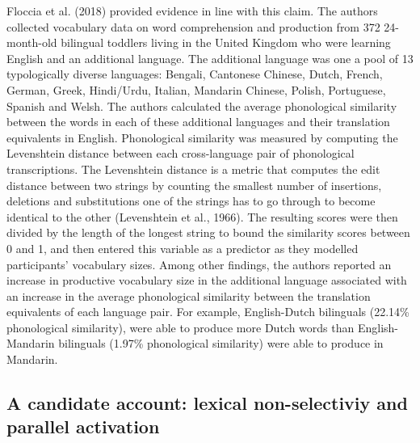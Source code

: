 \documentclass[
  letterpaper,
  DIV=11,
  numbers=noendperiod]{scrartcl}
\begin{document}
Floccia et al. (2018) provided evidence in line with this claim. The
authors collected vocabulary data on word comprehension and production
from 372 24-month-old bilingual toddlers living in the United Kingdom
who were learning English and an additional language. The additional
language was one a pool of 13 typologically diverse languages: Bengali,
Cantonese Chinese, Dutch, French, German, Greek, Hindi/Urdu, Italian,
Mandarin Chinese, Polish, Portuguese, Spanish and Welsh. The authors
calculated the average phonological similarity between the words in each
of these additional languages and their translation equivalents in
English. Phonological similarity was measured by computing the
Levenshtein distance between each cross-language pair of phonological
transcriptions. The Levenshtein distance is a metric that computes the
edit distance between two strings by counting the smallest number of
insertions, deletions and substitutions one of the strings has to go
through to become identical to the other (Levenshtein et al., 1966). The
resulting scores were then divided by the length of the longest string
to bound the similarity scores between 0 and 1, and then entered this
variable as a predictor as they modelled participants' vocabulary sizes.
Among other findings, the authors reported an increase in productive
vocabulary size in the additional language associated with an increase
in the average phonological similarity between the translation
equivalents of each language pair. For example, English-Dutch bilinguals
(22.14\% phonological similarity), were able to produce more Dutch words
than English-Mandarin bilinguals (1.97\% phonological similarity) were
able to produce in Mandarin.

\hypertarget{a-candidate-account-lexical-non-selectiviy-and-parallel-activation}{%
\subsection{A candidate account: lexical non-selectiviy and parallel
activation}\label{a-candidate-account-lexical-non-selectiviy-and-parallel-activation}}
\end{document}
